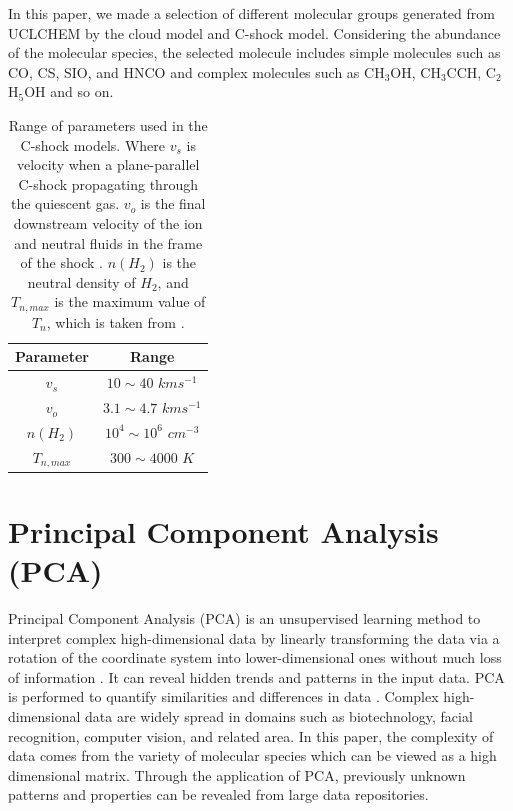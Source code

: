 \documentclass{aa}
\begin{document}
\begin{CJK*}{UTF8}{gbsn}
   In this paper, we made a selection of different molecular groups generated from UCLCHEM by the cloud model and C-shock model. Considering the abundance of the molecular species, the selected molecule includes simple molecules such as CO, CS, SIO, and HNCO and complex molecules such as CH$_3$OH, CH$_3$CCH, C$_2$H$_5$OH and so on. 
 
    \begin{table}[]
    \centering
    \begin{tabular}{cc}
    \hline\hline
    Parameter           & Range               \\
    \hline
    $v_s$                                & $10\sim 40$ $kms^{-1}$  \\
    $v_o$                             & $3.1 \sim 4.7$ $kms^{-1}$ \\
    $n(H_2)$                        & $10^4 \sim 10^6$ $ cm^{-3}$  \\
    $T_{n,max}$                         & $300 \sim 4000$ $K$ \\
    \hline
    \end{tabular}
    \caption{Range of parameters used in the C-shock models. Where $v_s$ is velocity when a plane-parallel C-shock propagating through the quiescent gas. $v_o$ is the final downstream velocity of the ion and neutral fluids in the frame of the shock \citep{jimenez2008parametrization}. $n(H_2)$ is the neutral density of $H_2$, and $T_{n,max}$ is the maximum value of $T_n$, which is taken from \citep{draine1983magnetohydrodynamic}.}
    \label{tab:physparam-shock}
    \end{table}
   

\section{Principal Component Analysis (PCA)}

   Principal Component Analysis (PCA) is an unsupervised learning method to interpret complex high-dimensional data by linearly transforming the data via a rotation of the coordinate system into lower-dimensional ones without much loss of information \citep{shlens2014tutorial}.
   It can reveal hidden trends and patterns in the input data.
   PCA is performed to quantify similarities and differences in data \citep{jere2019principal}.
   Complex high-dimensional data are widely spread in domains such as biotechnology, facial recognition, computer vision, and related area. 
   In this paper, the complexity of data comes from the variety of molecular species which can be viewed as a high dimensional matrix. 
   Through the application of PCA, previously unknown patterns and properties can be revealed from large data repositories.
   

\end{CJK*}
\end{document}
